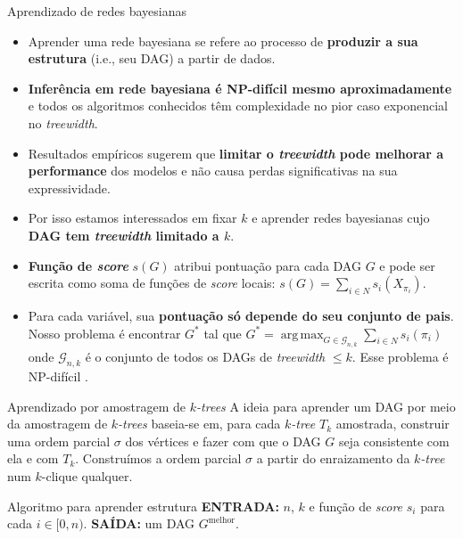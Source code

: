 \documentclass{beamer}
\DeclareMathOperator*{\argmax}{arg\,max}
\begin{document}
\begin{frame}
\begin{columns}[t]
\begin{column}{0.5\textwidth}
  \begin{block}{Aprendizado de redes bayesianas}
    \begin{itemize}
      \item Aprender uma rede bayesiana se refere ao processo de \textbf{produzir a sua estrutura} (i.e., seu DAG) a partir de dados.
      \item \textbf{Inferência em rede bayesiana é NP-difícil mesmo aproximadamente} e todos os algoritmos conhecidos têm complexidade no pior caso exponencial no \emph{treewidth}.
      \item Resultados empíricos sugerem que \textbf{limitar o \emph{treewidth} pode melhorar a performance} dos modelos e não causa perdas significativas na sua expressividade.
      \item Por isso estamos interessados em fixar $k$ e aprender redes bayesianas cujo \textbf{DAG tem \emph{treewidth} limitado a $k$}.
      \item \textbf{Função de \emph{score}} $s(G)$ atribui pontuação para cada DAG $G$ e pode ser escrita como soma de funções de \emph{score} locais: $s(G) = \sum_{i \in N} s_i(X_{\pi_i})$.
      \item Para cada variável, sua \textbf{pontuação só depende do seu conjunto de pais}. Nosso problema é encontrar $G^*$ tal que $G^* = \argmax_{G \in \mathcal{G}_{n,k}} \sum_{i \in N} s_i(\pi_i)$ onde $\mathcal{G}_{n,k}$ é o conjunto de todos os DAGs de \emph{treewidth} $\leq k$. Esse problema é NP-difícil \cite{korhonen}.
    \end{itemize}
  \end{block}

  \begin{block}{Aprendizado por amostragem de \emph{$k$-trees}}
    A ideia para aprender um DAG por meio da amostragem de \emph{$k$-trees} baseia-se em, para cada \emph{$k$-tree} $T_k$ amostrada, construir uma ordem parcial $\sigma$ dos vértices e fazer com que o DAG $G$ seja consistente com ela e com $T_k$. Construímos a ordem parcial $\sigma$ a partir do enraizamento da \emph{$k$-tree} num $k$-clique qualquer.
  \end{block}

  \begin{block}{Algoritmo para aprender estrutura}
    \textbf{ENTRADA:} $n$, $k$ e função de \emph{score} $s_i$ para cada $i \in [0, n)$. \hfill \textbf{SAÍDA:} um DAG $G^{\text{melhor}}$.


\end{block}
\end{column}
\end{columns}
\end{frame}
\end{document}
